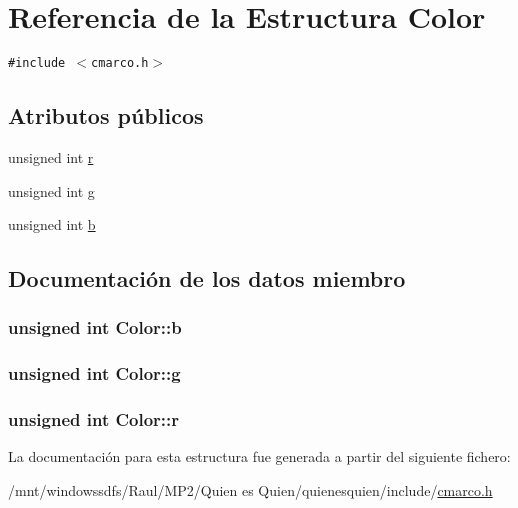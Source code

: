 \hypertarget{struct_color}{
\section{Referencia de la Estructura Color}
\label{struct_color}
}
{\tt \#include $<$cmarco.h$>$}

\subsection*{Atributos públicos}
\begin{CompactItemize}
\item 
unsigned int \hyperlink{struct_color_b002893979bedaf789d3780f1cfd4e9d}{r}
\item 
unsigned int \hyperlink{struct_color_d4ac573902e38d4232920836870f472f}{g}
\item 
unsigned int \hyperlink{struct_color_9c8ba12e91354ffe64ca906d5e77d060}{b}
\end{CompactItemize}


\subsection{Documentación de los datos miembro}
\hypertarget{struct_color_9c8ba12e91354ffe64ca906d5e77d060}{
\subsubsection[{b}]{\setlength{\rightskip}{0pt plus 5cm}unsigned int {\bf Color::b}}}
\label{struct_color_9c8ba12e91354ffe64ca906d5e77d060}


\hypertarget{struct_color_d4ac573902e38d4232920836870f472f}{
\subsubsection[{g}]{\setlength{\rightskip}{0pt plus 5cm}unsigned int {\bf Color::g}}}
\label{struct_color_d4ac573902e38d4232920836870f472f}


\hypertarget{struct_color_b002893979bedaf789d3780f1cfd4e9d}{
\subsubsection[{r}]{\setlength{\rightskip}{0pt plus 5cm}unsigned int {\bf Color::r}}}
\label{struct_color_b002893979bedaf789d3780f1cfd4e9d}




La documentación para esta estructura fue generada a partir del siguiente fichero:\begin{CompactItemize}
\item 
/mnt/windowssdfs/Raul/MP2/Quien es Quien/quienesquien/include/\hyperlink{cmarco_8h}{cmarco.h}\end{CompactItemize}

